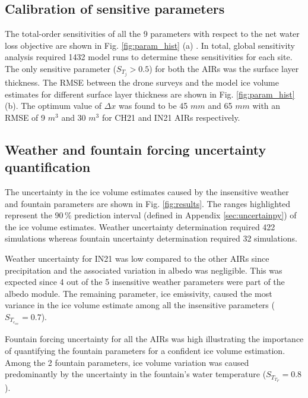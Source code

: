 \documentclass[utf8]{frontiersSCNS}
\begin{document}
\subsection{Calibration of sensitive parameters}

The total-order sensitivities of all the 9 parameters with respect to the net water loss objective are shown in
Fig. \ref{fig:param_hist} (a) . In total, global sensitivity analysis required 1432 model runs to determine these
sensitivities for each site. The only sensitive parameter ($S_{T_{j}} > 0.5$) for both the AIRs was the surface
layer thickness. The RMSE between the drone surveys and the model ice volume estimates for different surface
layer thickness are shown in Fig. \ref{fig:param_hist} (b). The optimum value of $\Delta x$ was found to be 45
$mm$ and 65 $mm$ with an RMSE of 9 $m^3$ and 30 $m^3$ for CH21 and IN21 AIRs respectively.


\subsection{Weather and fountain forcing uncertainty quantification}

The uncertainty in the ice volume estimates caused by the insensitive weather and fountain parameters are shown
in Fig. \ref{fig:results}. The ranges highlighted represent the $90\,\%$ prediction interval (defined in Appendix
\ref{sec:uncertainpy}) of the ice volume estimates. Weather uncertainty determination required 422 simulations
whereas fountain uncertainty determination required 32 simulations.

Weather uncertainty for IN21 was low compared to the other AIRs since precipitation and the associated variation
in albedo was negligible. This was expected since 4 out of the 5 insensitive weather parameters were part of the
albedo module. The remaining parameter, ice emissivity, caused the most variance in the ice volume estimate
among all the insensitive parameters ($S_{T_{\epsilon_{ice}}} = 0.7$).

Fountain forcing uncertainty for all the AIRs was high illustrating the importance of quantifying the fountain parameters for
a confident ice volume estimation. Among the 2 fountain parameters, ice volume variation was caused predominantly
by the uncertainty in the fountain's water temperature ($S_{T_{T_F}} = 0.8$).
\end{document}
